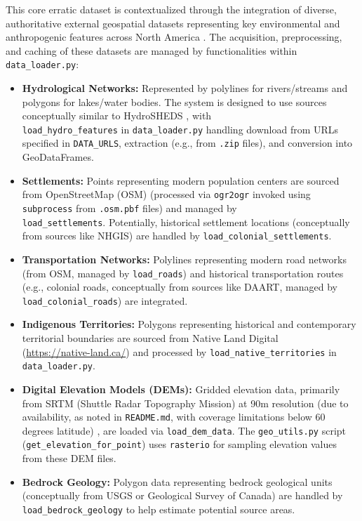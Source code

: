 \documentclass[
11pt, %
english, %
singlespacing, %
headsepline, %
]{MastersDoctoralThesis} %
\begin{document}
This core erratic dataset is contextualized through the integration of diverse, authoritative external geospatial datasets representing key environmental and anthropogenic features across North America \cite{Worboys2004}. The acquisition, preprocessing, and caching of these datasets are managed by functionalities within \texttt{data\_loader.py}:
\begin{itemize}
    \item \textbf{Hydrological Networks:} Represented by polylines for rivers/streams and polygons for lakes/water bodies. The system is designed to use sources conceptually
    similar to HydroSHEDS \cite{Lehner2008}, with \\  \texttt{load\_hydro\_features} in 
    \texttt{data\_loader.py} handling download from URLs specified in \texttt{DATA\_URLS},
    extraction (e.g., from \texttt{.zip} files), and conversion into GeoDataFrames.
    
    \item \textbf{Settlements:} Points representing modern population centers are sourced from OpenStreetMap (OSM) (processed via \texttt{ogr2ogr} invoked using 
    \texttt{subprocess} from \texttt{.osm.pbf} files) and managed by \\ \texttt{load\_settlements}. Potentially, historical settlement locations (conceptually
    from sources like NHGIS) are handled by \texttt{load\_colonial\_settlements}.
    
    \item \textbf{Transportation Networks:} Polylines representing modern road networks (from OSM, managed by \texttt{load\_roads}) and historical transportation routes 
    (e.g., colonial roads, conceptually from sources like DAART, managed by \\
    \texttt{load\_colonial\_roads}) are integrated.
    \item \textbf{Indigenous Territories:} Polygons representing historical and contemporary territorial boundaries are sourced from Native Land Digital \\
    (\url{https://native-land.ca/}) and processed by \texttt{load\_native\_territories} in \texttt{data\_loader.py}.
    \item \textbf{Digital Elevation Models (DEMs):} Gridded elevation data, primarily from SRTM (Shuttle Radar Topography Mission) at 90m resolution (due to availability, as noted in \texttt{README.md}, with coverage limitations below 60 degrees latitude) 
    \cite{Farr2007}, are loaded via \texttt{load\_dem\_data}. The \texttt{geo\_utils.py} script (\texttt{get\_elevation\_for\_point}) uses \texttt{rasterio} for sampling elevation values from these DEM files.
    \item \textbf{Bedrock Geology:} Polygon data representing bedrock geological units (conceptually from USGS or Geological Survey of Canada) 
    are handled by \\ \texttt{load\_bedrock\_geology} 
    to help estimate potential source areas.
\end{itemize}
\end{document}
